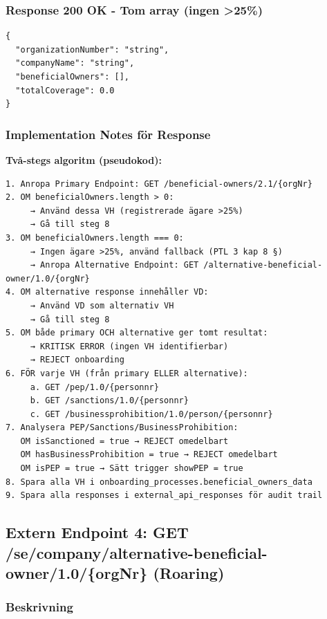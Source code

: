 \subsubsection{Response 200 OK - Tom array (ingen >25\%)}
\begin{lstlisting}
{
  "organizationNumber": "string",
  "companyName": "string",
  "beneficialOwners": [],
  "totalCoverage": 0.0
}
\end{lstlisting}

\subsubsection{Implementation Notes för Response}

\textbf{Två-stegs algoritm (pseudokod):}
\begin{lstlisting}
1. Anropa Primary Endpoint: GET /beneficial-owners/2.1/{orgNr}
2. OM beneficialOwners.length > 0:
     → Använd dessa VH (registrerade ägare >25%)
     → Gå till steg 8
3. OM beneficialOwners.length === 0:
     → Ingen ägare >25%, använd fallback (PTL 3 kap 8 §)
     → Anropa Alternative Endpoint: GET /alternative-beneficial-owner/1.0/{orgNr}
4. OM alternative response innehåller VD:
     → Använd VD som alternativ VH
     → Gå till steg 8
5. OM både primary OCH alternative ger tomt resultat:
     → KRITISK ERROR (ingen VH identifierbar)
     → REJECT onboarding
6. FÖR varje VH (från primary ELLER alternative):
     a. GET /pep/1.0/{personnr}
     b. GET /sanctions/1.0/{personnr}
     c. GET /businessprohibition/1.0/person/{personnr}
7. Analysera PEP/Sanctions/BusinessProhibition:
   OM isSanctioned = true → REJECT omedelbart
   OM hasBusinessProhibition = true → REJECT omedelbart
   OM isPEP = true → Sätt trigger showPEP = true
8. Spara alla VH i onboarding_processes.beneficial_owners_data
9. Spara alla responses i external_api_responses för audit trail
\end{lstlisting}

\subsection{Extern Endpoint 4: GET /se/company/alternative-beneficial-owner/1.0/\{orgNr\} (Roaring)}

\subsubsection{Beskrivning}


